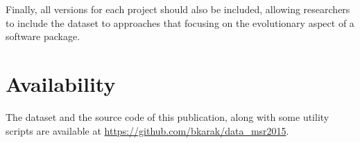 \documentclass{sig-alternate}
\begin{document}
Finally, all versions for each project should also be included, allowing researchers to include the dataset to approaches that focusing on the evolutionary aspect of a software package.

\section{Availability}

The dataset and the source code of this publication, along with some utility scripts are available at \url{https://github.com/bkarak/data_msr2015}.



\end{document}
